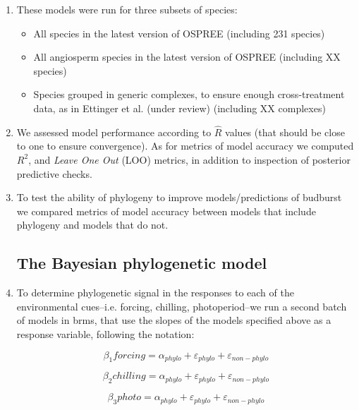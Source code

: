 \documentclass{article}\usepackage[]{graphicx}\usepackage[]{color}
\begin{document}
\begin{enumerate}
\item These models were run for three subsets of species:
\begin{itemize}
\item All species in the latest version of OSPREE (including 231 species)
\item All angiosperm species in the latest version of OSPREE (including XX species)
\item Species grouped in generic complexes, to ensure enough cross-treatment data, as in Ettinger et al. (under review) (including XX complexes)
\end{itemize}

\item We assessed model performance according to $\hat{R}$ values (that should be close to one to ensure convergence). As for metrics of model accuracy we computed $R^{2}$, and \emph{Leave One Out} (LOO) metrics, in addition to inspection of posterior predictive checks.

\item To test the ability of phylogeny to improve models/predictions of budburst we compared metrics of model accuracy between models that include phylogeny and models that do not.


\subsection*{The Bayesian phylogenetic model}

\item To determine phylogenetic signal in the responses to each of the environmental cues--i.e. forcing, chilling, photoperiod--we run a second batch of models in brms, that use the slopes of the models specified above as a response variable, following the notation:



\begin{equation}
\label{eq:5} 
\beta_{1}forcing = \alpha_{phylo} + \varepsilon_{phylo} + \varepsilon_{non-phylo}
\end{equation}

\begin{equation}
\label{eq:6} 
\beta_{2}chilling = \alpha_{phylo} + \varepsilon_{phylo} + \varepsilon_{non-phylo}
\end{equation}

\begin{equation}
\label{eq:7} 
\beta_{3}photo = \alpha_{phylo} + \varepsilon_{phylo} + \varepsilon_{non-phylo}
\end{equation}


\end{enumerate}
\end{document}
